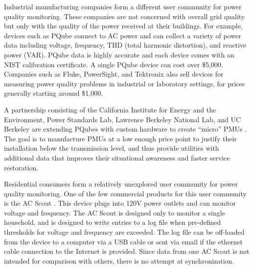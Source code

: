 
Industrial manufacturing companies form a different user community for power quality monitoring. These companies are not concerned with overall grid quality but only with the quality of the power received at their buildings.  For example, devices such as PQube \cite{pqube} connect to AC power and can collect a variety of power data including voltage, frequency, THD (total harmonic distortion), and reactive power (VAR). PQube data is highly accurate and each device comes with an NIST calibration certificate. A single PQube device can cost over \$5,000.  Companies such as Fluke, PowerSight, and Tektronix also sell devices for measuring power quality problems in industrial or laboratory settings, for prices generally starting around \$1,000.

A partnership consisting of the California Institute for Energy and the Environment, Power Standards Lab, Lawrence Berkeley National Lab, and UC Berkeley are extending PQubes with custom hardware to create ``micro'' PMUs \cite{Meier2013,Meier2014}.  The goal is to manufacture PMUs at a low enough price point to justify their installation below the transmission level, and thus provide utilities with additional data that improves their situational awareness and faster service restoration.  

Residential consumers form a relatively unexplored user community for power quality monitoring.   One of the few commercial products for this user community is the AC Scout \cite{acscout}.  This device plugs into 120V power outlets and can monitor voltage and frequency. The AC Scout is designed only to monitor a single household, and is designed to write entries to a log file when pre-defined thresholds for voltage and frequency are exceeded. The log file can be off-loaded from the device to a computer via a USB cable or sent via email if the ethernet cable connection to the Internet is provided. Since data from one AC Scout is not intended for comparison with others, there is no attempt at synchronization.


